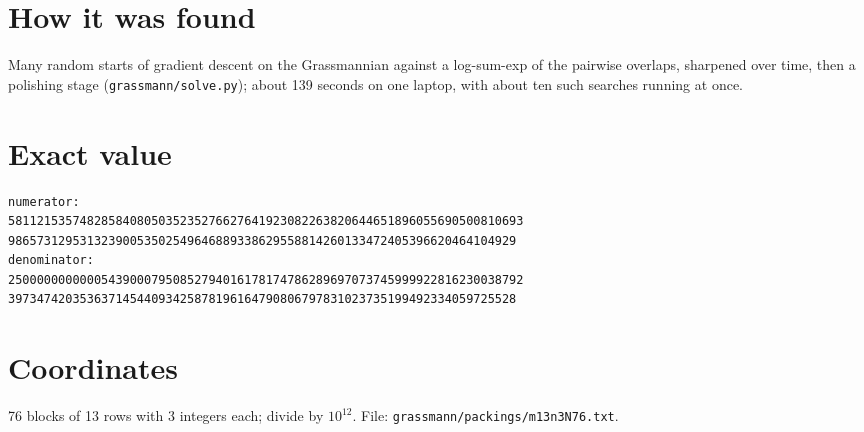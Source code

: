\documentclass[11pt,a4paper]{article}
\begin{document}
\section{How it was found}
Many random starts of gradient descent on the Grassmannian against a log-sum-exp of the pairwise overlaps, sharpened over time, then a polishing stage (\texttt{grassmann/solve.py}); about 139 seconds on one laptop, with about ten such searches running at once.


\appendix
\section{Exact value}
{\small
\begin{verbatim}
numerator:
581121535748285840805035235276627641923082263820644651896055690500810693
98657312953132390053502549646889338629558814260133472405396620464104929
denominator:
250000000000054390007950852794016178174786289697073745999922816230038792
39734742035363714544093425878196164790806797831023735199492334059725528
\end{verbatim}}

\section{Coordinates}
76 blocks of 13 rows with 3 integers each; divide by $10^{12}$. File: \texttt{grassmann/packings/m13n3N76.txt}.
{\tiny
\begin{multicols}{3}
\end{multicols}}
\end{document}
